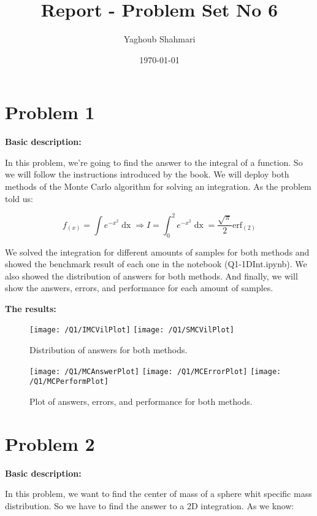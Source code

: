 \documentclass{article}
\author{Yaghoub Shahmari}
\title{Report - Problem Set No 6}
\date{\today}
\begin{document}
    \maketitle
    \section*{Problem 1}
    \textbf{Basic description:}

    In this problem, we're going to find the answer to the integral of a function.
    So we will follow the instructions introduced by the book.
    We will deploy both methods of the Monte Carlo algorithm for solving an integration.
    As the problem told us:

    $$f_{(x)} = \int e^{-x^2} \mathop{dx} \Rightarrow I = \int_0^2 e^{-x^2} \mathop{dx} = \frac{\sqrt{\pi}}{2} \mathrm{erf}_{(2)}$$
    
    We solved the integration for different amounts of samples for both methods
    and showed the benchmark result of each one in the notebook (Q1-1DInt.ipynb).
    We also showed the distribution of answers for both methods.
    And finally, we will show the answers, errors, and performance for each amount of samples.

    \textbf{The results:}

    \begin{figure}[!htb]
        \centering
        \texttt{[image: /Q1/IMCVilPlot]}
        \label{fig:1.1}
        \texttt{[image: /Q1/SMCVilPlot]}
        \label{fig:1.2}
        \caption{Distribution of answers for both methods.}
    \end{figure}

    \begin{figure}[!htb]
        \centering
        \texttt{[image: /Q1/MCAnswerPlot]}
        \label{fig:1.3}
        \texttt{[image: /Q1/MCErrorPlot]}
        \label{fig:1.4}
        \texttt{[image: /Q1/MCPerformPlot]}
        \label{fig:1.5}
        \caption{Plot of answers, errors, and performance for both methods.}
    \end{figure}

    \pagebreak

    \section*{Problem 2}
    \textbf{Basic description:}

    In this problem, we want to find the center of mass of
    a sphere whit specific mass distribution.
    So we have to find the answer to a 2D integration.
    As we know:
\end{document}
